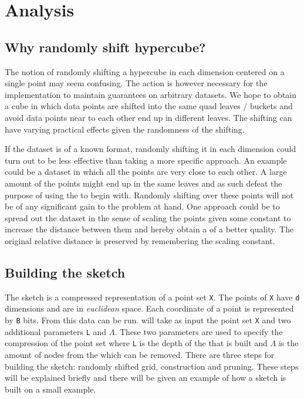 \section{Analysis}
\label{analysis}

\subsection{Why randomly shift hypercube?}
The notion of randomly shifting a hypercube in each dimension centered on a single point may seem confusing. The action is however necessary for the \qs{} implementation to maintain guarantees on arbitrary datasets. We hope to obtain a cube in which data points are shifted into the same quad leaves / buckets and avoid data points near to each other end up in different leaves. The shifting can have varying practical effects given the randomness of the shifting.

If the dataset is of a known format, randomly shifting it in each dimension could turn out to be less effective than taking a more specific approach. An example could be a dataset in which all the points are very close to each other. A large amount of the points might end up in the same leaves and as such defeat the purpose of using the \qt{} to begin with. Randomly shifting over these points will not be of any significant gain to the problem at hand. One approach could be to spread out the dataset in the sense of scaling the points given some constant to increase the distance between them and hereby obtain a \qt{} of a better quality. The original relative distance is preserved by remembering the scaling constant.

\subsection{Building the sketch}
The sketch is a compressed representation of a point set \texttt{X}. The points of \texttt{X} have \texttt{d} dimensions and are in \textit{euclidean} space. Each coordinate of a point is represented by \texttt{B} bits. From this data \qs{} can be run. \qs{} will take as input the point set \texttt{X} and two additional parameters \texttt{L} and $\Lambda$. These two parameters are used to specify the compression of the point set where \texttt{L} is the depth of the \qt{} that is built and $\Lambda$ is the amount of nodes from the \qt{} which can be removed. There are three steps for building the sketch: randomly shifted grid, \qt{} construction and pruning. These steps will be explained briefly and there will be given an example of how a sketch is built on a small example.

